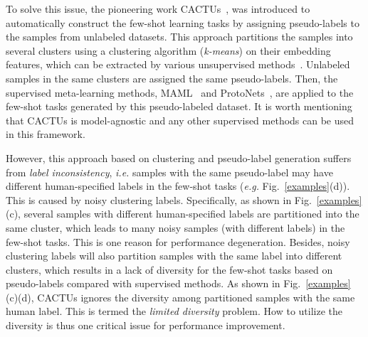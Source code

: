 \documentclass[runningheads]{llncs}
\begin{document}
To solve this issue, the pioneering work CACTUs~\cite{hsu2018unsupervised}, was introduced to automatically construct the few-shot learning tasks by assigning pseudo-labels to the samples from unlabeled datasets. This approach partitions the samples into several clusters using a clustering algorithm ({\it k-means}) on their embedding features, which can be extracted by various unsupervised methods~\cite{hinton2006fast,bengio2007greedy,ranzato2007efficient,vincent2008extracting,erhan2010does}. Unlabeled samples in the same clusters are assigned the same pseudo-labels. Then, the supervised meta-learning methods, MAML~\cite{finn2017model} and ProtoNets~\cite{snell2017prototypical}, are applied to the few-shot tasks generated by this pseudo-labeled dataset. It is worth mentioning that CACTUs is model-agnostic and any other supervised methods can be used in this framework. 

However, this approach based on clustering and pseudo-label generation suffers from {\it label inconsistency}, {\emph{i.e.}} samples with the same pseudo-label may have different human-specified labels in the few-shot tasks (\textit{e.g.} Fig.~\ref{examples}(d)). This is caused by noisy clustering labels. 
Specifically, as shown in Fig.~\ref{examples}(c), several samples with different human-specified labels are partitioned into the same cluster, which leads to many noisy samples (with different labels) in the few-shot tasks. This is one reason for performance degeneration. Besides, noisy clustering labels will also partition samples with the same label into different clusters, which results in a lack of diversity for the few-shot tasks based on pseudo-labels compared with supervised methods. As shown in Fig.~\ref{examples} (c)(d), CACTUs ignores the diversity among partitioned samples with the same human label. This is termed the {\it limited diversity} problem. How to utilize the diversity is thus one critical issue for performance improvement.







 
\end{document}
